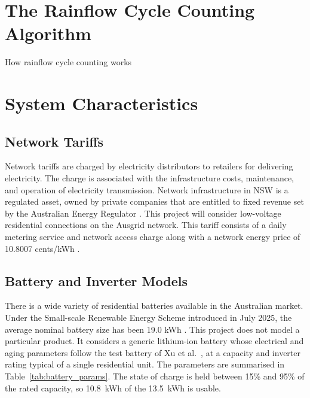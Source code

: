 \section{The Rainflow Cycle Counting Algorithm}
How rainflow cycle counting works


\section{System Characteristics}
\subsection{Network Tariffs}
Network tariffs are charged by electricity distributors to retailers for delivering electricity. The charge is associated with the infrastructure costs, maintenance, and operation of electricity transmission. Network infrastructure in NSW is a regulated asset, owned by private companies that are entitled to fixed revenue set by the Australian Energy Regulator \cite{AER_ReturnOnAssets}. This project will consider low-voltage residential connections on the Ausgrid network. This tariff consists of a daily metering service and network access charge along with a network energy price of 10.8007 cents/kWh \cite{ausgrid2024networkpricelist}.

\subsection{Battery and Inverter Models}
There is a wide variety of residential batteries available in the Australian market. Under the Small-scale Renewable Energy Scheme introduced in July 2025, the average nominal battery size has been 19.0 kWh \cite{CER2025battery}. This project does not model a particular product. It considers a generic lithium-ion battery whose electrical and aging parameters follow the test battery of Xu et al.\ \cite{Xu2018}, at a capacity and inverter rating typical of a single residential unit. The parameters are summarised in Table~\ref{tab:battery_params}. The state of charge is held between 15\% and 95\% of the rated capacity, so 10.8~kWh of the 13.5~kWh is usable.

